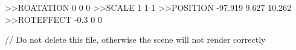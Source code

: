 >>ROATATION
0
0
0
>>SCALE
1
1
1
>>POSITION
-97.919
9.627
10.262
>>ROTEFFECT
-0.3
0
0

// Do not delete this file, otherwise the scene will not render correctly
